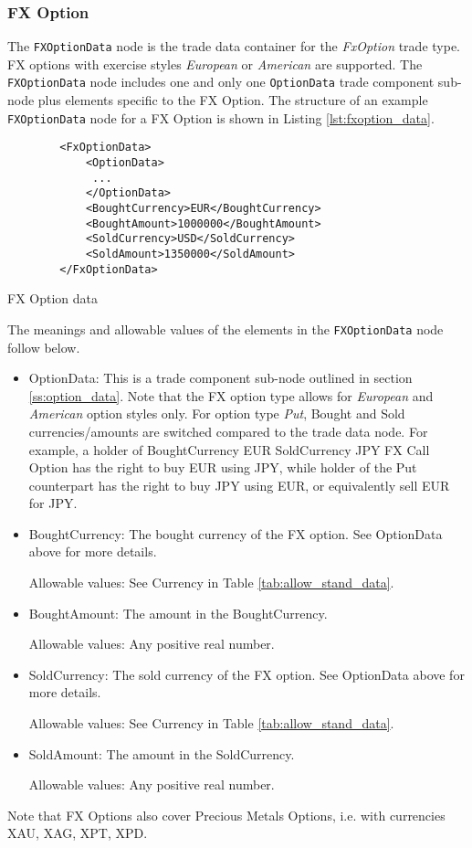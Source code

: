\subsubsection{FX Option}

The \lstinline!FXOptionData!  node is the trade data container for the \emph{FxOption} trade type.   FX options with exercise styles  \emph{European} or \emph{American} are supported. 
The \lstinline!FXOptionData!  node includes one and only one \lstinline!OptionData! trade
component sub-node plus elements specific to the FX Option. The structure of an example \lstinline!FXOptionData! node
for a FX Option is shown in Listing \ref{lst:fxoption_data}.

\begin{listing}[H]
\begin{verbatim}
        <FxOptionData>
            <OptionData>
             ...
            </OptionData>
            <BoughtCurrency>EUR</BoughtCurrency>
            <BoughtAmount>1000000</BoughtAmount>
            <SoldCurrency>USD</SoldCurrency>
            <SoldAmount>1350000</SoldAmount>
        </FxOptionData>
\end{verbatim}
\caption{FX Option data}
\label{lst:fxoption_data}
\end{listing}

The meanings and allowable values of the elements in the \lstinline!FXOptionData!  node follow below.

\begin{itemize}
\item OptionData: This is a trade component sub-node outlined in section \ref{ss:option_data}. Note that the
  FX option type allows for \emph{European} and \emph{American} option styles only. For option type \emph{Put}, Bought and Sold currencies/amounts are switched compared to the trade data node.
For example, a holder of BoughtCurrency EUR SoldCurrency JPY FX Call Option has the right to buy EUR using JPY, while
holder of the Put counterpart has the right to buy JPY using EUR, or equivalently sell EUR for JPY. 

\item BoughtCurrency: The bought currency of the FX option. See OptionData above for more details.

Allowable values:  See Currency in Table \ref{tab:allow_stand_data}.

\item BoughtAmount: The amount in the BoughtCurrency.  

Allowable values:  Any positive real number.

\item SoldCurrency: The sold currency of the FX option. See OptionData above for more details.

Allowable values:  See Currency in Table \ref{tab:allow_stand_data}.

\item SoldAmount: The amount in the SoldCurrency.  

Allowable values:  Any positive real number.

\end{itemize}

Note that FX Options also cover Precious Metals Options, i.e. with
currencies XAU, XAG, XPT, XPD.